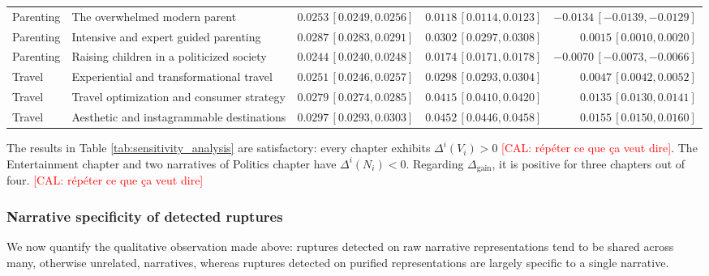 \documentclass[
  journal=medium,
  manuscript=article-type,
  year=2025,
  volume=1,
]{cup-journal}
\begin{document}
\begin{table}[htbp]
{\begin{tabular}{llrrr}
Parenting &
The overwhelmed modern parent &
$0.0253\, [0.0249, 0.0256]$ &
$0.0118\, [0.0114, 0.0123]$ &
\color{red}$-0.0134\, [-0.0139, -0.0129]$ \\

Parenting &
Intensive and expert guided parenting &
$0.0287\, [0.0283, 0.0291]$ &
$0.0302\, [0.0297, 0.0308]$ &
$0.0015\, [0.0010, 0.0020]$ \\

Parenting &
Raising children in a politicized society &
$0.0244\, [0.0240, 0.0248]$ &
$0.0174\, [0.0171, 0.0178]$ &
\color{red}$-0.0070\, [-0.0073, -0.0066]$ \\

Travel &
Experiential and transformational travel &
$0.0251\, [0.0246, 0.0257]$ &
$0.0298\, [0.0293, 0.0304]$ &
$0.0047\, [0.0042, 0.0052]$ \\

Travel &
Travel optimization and consumer strategy &
$0.0279\, [0.0274, 0.0285]$ &
$0.0415\, [0.0410, 0.0420]$ &
$0.0135\, [0.0130, 0.0141]$ \\

Travel &
Aesthetic and instagrammable destinations &
$0.0297\, [0.0293, 0.0303]$ &
$0.0452\, [0.0446, 0.0458]$ &
$0.0155\, [0.0150, 0.0160]$ \\
\bottomrule
\end{tabular}%
}
\end{table}

The results in Table \ref{tab:sensitivity_analysis} are satisfactory: every chapter exhibits $\Delta^i(V_i) > 0$ \textcolor{red}{[CAL: répéter ce que ça veut dire]}. The Entertainment chapter and two narratives of Politics chapter have $\Delta^i(N_i) < 0$. Regarding $\Delta_{\text{gain}}$, it is positive for three chapters out of four.
\textcolor{red}{[CAL: répéter ce que ça veut dire]}

\subsubsection{Narrative specificity of detected ruptures}

We now quantify the qualitative observation made above: ruptures detected on raw narrative representations tend to be shared across many, otherwise unrelated, narratives, whereas ruptures detected on purified representations are largely specific to a single narrative.
\end{document}
